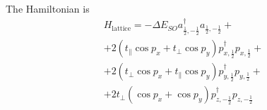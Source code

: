 \documentclass{article}
\begin{document}
The Hamiltonian is 
\begin{multline}
	H_{\mathrm{lattice}} = -\Delta E_{SO} 
			a_{\frac{1}{2}, -\frac{1}{2}}^\dagger a_{\frac{1}{2}, -\frac{1}{2}}
			+\\
			+2 (t_{\parallel} \cos{p_x} + t_{\perp} \cos{p_y})
				p_{x,\frac 12}^\dagger p_{x,\frac 12}+\\
			+2(t_{\perp} \cos{p_x} + t_{\parallel} \cos{p_y})
				p_{y,\frac 12}^\dagger p_{y,\frac 12} +\\
			+2t_{\perp}( \cos{p_x} + \cos{p_y})
				p_{z,-\frac 12}^\dagger p_{z,-\frac 12} 
\end{multline}
\end{document}
